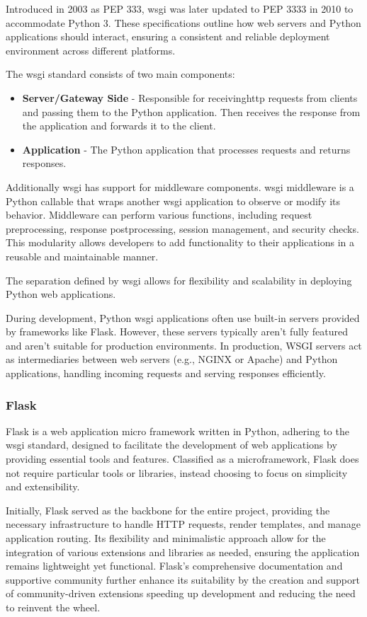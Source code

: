 Introduced in 2003 as PEP 333, \ac{wsgi} was later updated to PEP 3333 in 2010 to accommodate Python 3. These specifications 
outline how web servers and Python applications should interact, ensuring a consistent and reliable deployment environment 
across different platforms.

The \ac{wsgi} standard consists of two main components:
\begin{itemize}
  \item \textbf{Server/Gateway Side} - Responsible for receiving\ac{http} requests from clients and passing them to the 
  Python application. Then receives the response from the application and forwards it to the client. 
  \item \textbf{Application} - The Python application that processes requests and returns responses.
\end{itemize}

Additionally \ac{wsgi} has support for middleware components. \ac{wsgi} middleware is a Python callable that wraps another 
\ac{wsgi} application to observe or modify its behavior. Middleware can perform various functions, including request 
preprocessing, response postprocessing, session management, and security checks. This modularity allows developers to 
add functionality to their applications in a reusable and maintainable manner.

The separation defined by \ac{wsgi} allows for flexibility and scalability in deploying Python web applications.

During development, Python \ac{wsgi} applications often use built-in servers provided by frameworks like Flask. 
However, these servers typically aren't fully featured and aren't suitable for production environments. In production, WSGI 
servers act as intermediaries between web servers (e.g., NGINX or Apache) and Python applications, handling incoming requests 
and serving responses efficiently.

\subsubsection{Flask}
Flask is a web application micro framework written in Python, adhering to the \ac{wsgi} standard, designed to 
facilitate the development of web applications by providing essential tools and features. Classified as a microframework, 
Flask does not require particular tools or libraries, instead choosing to focus on simplicity and extensibility\cite{flask2025}.

Initially, Flask served as the backbone for the entire project, providing the necessary infrastructure to handle HTTP 
requests, render templates, and manage application routing. Its flexibility and minimalistic approach allow for the 
integration of various extensions and libraries as needed, ensuring the application remains lightweight yet functional. 
Flask's comprehensive documentation and supportive community further enhance its suitability by the creation and support
of community-driven extensions speeding up development and reducing the need to reinvent the wheel.

